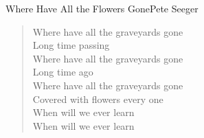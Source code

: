 \begin{song}{Where Have All the Flowers Gone}{Pete Seeger}
	\begin{verse}
		Where have all the graveyards gone \\
		Long time passing \\
		Where have all the graveyards gone \\
		Long time ago \\
		Where have all the graveyards gone \\
		Covered with flowers every one \\
		When will we ever learn \\
		When will we ever learn \\
	\end{verse}
	
\end{song}